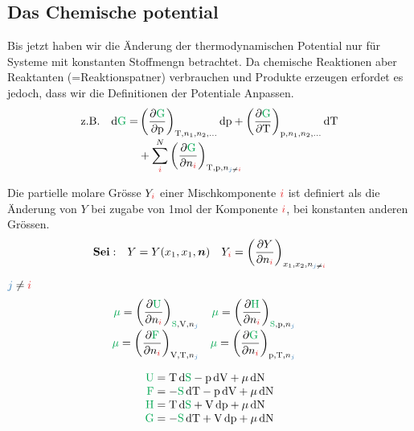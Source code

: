 \subsection{Das Chemische potential}
\begin{sectionbox}[Einleiung]\nospacing
 Bis jetzt haben wir die Änderung der thermodynamischen Potential nur für
 Systeme mit konstanten Stoffmengn betrachtet. Da chemische Reaktionen aber Reaktanten (=Reaktionspatner) verbrauchen und Produkte erzeugen erfordet es jedoch,
 dass wir die Definitionen der Potentiale Anpassen.
 \begin{align*}
   &\text{z.B.}&\diff\Gpot=&\left(\pfrac{\Gpot}{\pz}\right)_{\Tz,n_1,n_2,\ldots}\diff\pz+\left(\pfrac{\Gpot}{\Tz}\right)_{\pz,n_1,n_2,\ldots}\diff\Tz\nalign
               &&&+\sum_{\idxi}^N\left(\pfrac{\Gpot}{n_{\idxi}}\right)_{\Tz,\pz,n_{\idxj\neq\idxi}}
 \end{align*}
\end{sectionbox}
\begin{defnbox}\nospacing
  \begin{defn}
    Die partielle molare Grösse $Y_{\idxi}$ einer Mischkomponente $\idxi$ ist definiert als die Änderung von $Y$ bei zugabe von 1mol der Komponente $\idxi$,
    bei konstanten anderen Grössen.
    \begin{align*}
      &\text{\imp{Sei}}:& Y=Y(x_1,x_1,\vec{n})&&Y_{\idxi}=\left(\pfrac{Y}{n_{\idxi}}\right)_{x_1,x_2,n_{\idxj\neq\idxi}}
    \end{align*}
  \end{defn}
\end{defnbox}
\begin{defnbox}\nospacing
  \begin{defn}$\idxj\neq\idxi$
    \begin{align}
      \mupot=\left(\pfrac{\Upot}{n_{\idxi}}\right)_{\Spot,\Vz,n_{\idxj}}&&
      \mupot=\left(\pfrac{\Hpot}{n_{\idxi}}\right)_{\Spot,\pz,n_{\idxj}}\nalign
      \mupot=\left(\pfrac{\Fpot}{n_{\idxi}}\right)_{\Vz,\Tz,n_{\idxj}}&&
      \mupot=\left(\pfrac{\Gpot}{n_{\idxi}}\right)_{\pz,\Tz,n_{\idxj}}&&
    \end{align}
  \end{defn}
\end{defnbox}
\begin{defnbox}\nospacing
  \begin{defn}
    \begin{align}
      \Upot&=\Tz\diff\Spot-\pz\diff\Vz+\mu\diff\Nz\nalign
      \Fpot&=-\Spot\diff\Tz-\pz\diff\Vz+\mu\diff\Nz\nalign
      \Hpot&=\Tz\diff\Spot+\Vz\diff\pz+\mu\diff\Nz\nalign
      \Gpot&=-\Spot\diff\Tz+\Vz\diff\pz+\mu\diff\Nz\label{eq:chemPotG}
    \end{align}
  \end{defn}
\end{defnbox}
